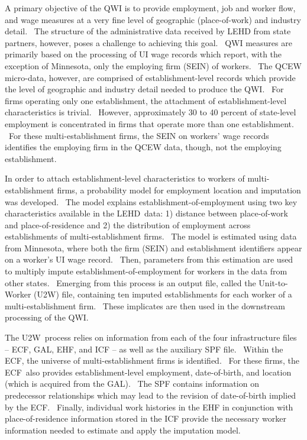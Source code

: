                       


%


 A primary objective of the QWI is to provide employment, job and
worker flow, and wage measures at a very fine level of geographic
(place-of-work) and industry detail. \ The structure of the administrative
data received by LEHD from state partners, however, poses a challenge to
achieving this goal. \ QWI measures are primarily based on the processing of
UI wage records which report, with the exception of Minnesota, only the
employing firm (SEIN) of workers. \ The QCEW micro-data, however, are
comprised of establishment-level records which provide the level of
geographic and industry detail needed to produce the QWI. \ For firms
operating only one establishment, the attachment of establishment-level
characteristics is trivial. \ However, approximately 30 to 40 percent of
state-level employment is concentrated in firms that operate more than one
establishment. \ For these multi-establishment firms, the SEIN on workers'
wage records identifies the employing firm in the QCEW data, though, not the
employing establishment.

In order to attach establishment-level characteristics to workers of
multi-establishment firms, a probability model for employment location and
imputation was developed. \ The model explains establishment-of-employment
using two key characteristics available in the LEHD\ data: 1) distance
between place-of-work and place-of-residence and 2) the distribution of
employment across establishments of multi-establishment firms. \ The model
is estimated using data from Minnesota, where both the firm (SEIN) and
establishment identifiers appear on a worker's UI wage record. \ Then,
parameters from this estimation are used to multiply impute
establishment-of-employment for workers in the data from other states. \
Emerging from this process is an output file, called the Unit-to-Worker
(U2W) file, containing ten imputed establishments for each worker of a
multi-establishment firm. \ These implicates are then used in the downstream
processing of the QWI.

 The U2W\ process relies on information from each of the four
infrastructure files -- ECF, GAL, EHF, and ICF -- as well as the auxiliary
SPF file. \ Within the ECF, the universe of multi-establishment firms is
identified. \ For these firms, the ECF\ also provides establishment-level
employment, date-of-birth, and location (which is acquired from the GAL). \
The SPF contains information on predecessor relationships which may lead to
the revision of date-of-birth implied by the ECF. \ Finally, individual work
histories in the EHF in conjunction with place-of-residence information
stored in the ICF provide the necessary worker information needed to
estimate and apply the imputation model.

